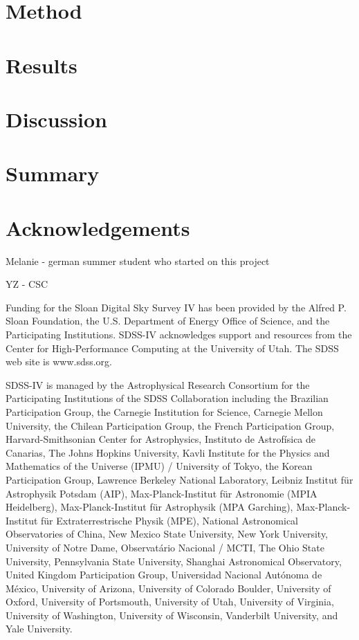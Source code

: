 \documentclass[fleqn,usenatbib]{mnras}
\begin{document}
\section{Method}
\label{sec:method}

\section{Results}
\label{sec:results}


\section{Discussion}
\label{sec:Discussion}

\section{Summary}
\label{sec:Summary}


\section*{Acknowledgements}

Melanie - german summer student who started on this project

YZ - CSC 



Funding for the Sloan Digital Sky Survey IV has been provided by the Alfred P. Sloan Foundation, the U.S. Department of Energy Office of Science, and the Participating Institutions. SDSS-IV acknowledges
support and resources from the Center for High-Performance Computing at
the University of Utah. The SDSS web site is www.sdss.org.

SDSS-IV is managed by the Astrophysical Research Consortium for the 
Participating Institutions of the SDSS Collaboration including the 
Brazilian Participation Group, the Carnegie Institution for Science, 
Carnegie Mellon University, the Chilean Participation Group, the French Participation Group, Harvard-Smithsonian Center for Astrophysics, 
Instituto de Astrof\'isica de Canarias, The Johns Hopkins University, Kavli Institute for the Physics and Mathematics of the Universe (IPMU) / 
University of Tokyo, the Korean Participation Group, Lawrence Berkeley National Laboratory, 
Leibniz Institut f\"ur Astrophysik Potsdam (AIP),  
Max-Planck-Institut f\"ur Astronomie (MPIA Heidelberg), 
Max-Planck-Institut f\"ur Astrophysik (MPA Garching), 
Max-Planck-Institut f\"ur Extraterrestrische Physik (MPE), 
National Astronomical Observatories of China, New Mexico State University, 
New York University, University of Notre Dame, 
Observat\'ario Nacional / MCTI, The Ohio State University, 
Pennsylvania State University, Shanghai Astronomical Observatory, 
United Kingdom Participation Group,
Universidad Nacional Aut\'onoma de M\'exico, University of Arizona, 
University of Colorado Boulder, University of Oxford, University of Portsmouth, 
University of Utah, University of Virginia, University of Washington, University of Wisconsin, 
Vanderbilt University, and Yale University.
\end{document}
